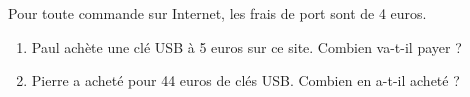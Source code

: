 
Pour toute commande sur Internet, les frais de port sont de 4 euros.
\begin{enumerate}
\item Paul achète une clé USB à 5 euros sur ce site. Combien va-t-il payer ?
\item Pierre a acheté pour 44 euros de clés USB. Combien en a-t-il acheté ?
\end{enumerate}
